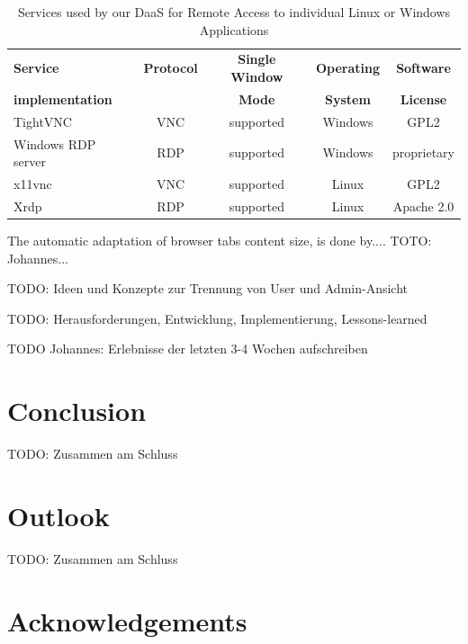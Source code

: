 \documentclass[runningheads]{llncs}
\begin{document}
\begin{table}
	\centering
	\caption{Services used by our DaaS for Remote Access to individual Linux or Windows Applications}
	\begin{tabular}{|l|c|c|c|c|}
		\hline
		\textbf{Service}    &  \textbf{Protocol}  & \textbf{Single Window}       & \textbf{Operating} & \textbf{Software}  \\
		\textbf{implementation}  &                & \textbf{Mode}                & \textbf{System}    & \textbf{License}   \\
		\hline
		TightVNC            &  VNC                & supported                    & Windows            & GPL2               \\
		\hline
		Windows RDP server  &  RDP                & supported                    & Windows            & proprietary        \\
		\hline
		x11vnc              &  VNC                & supported                    & Linux              & GPL2               \\
		\hline
		Xrdp                &  RDP                & supported                    & Linux              & Apache 2.0         \\
		\hline
	\end{tabular}
	\label{tab:DaaS_Services_Overview}
\end{table}

The automatic adaptation of browser tabs content size, is done by.... TOTO: Johannes...

TODO: Ideen und Konzepte zur Trennung von User und Admin-Ansicht

TODO: Herausforderungen, Entwicklung, Implementierung, Lessons-learned

TODO Johannes: Erlebnisse der letzten 3-4 Wochen aufschreiben



\section{Conclusion}
\label{sec:Conclusions}

TODO: Zusammen am Schluss

\section{Outlook}
\label{sec:NextSteps}

TODO: Zusammen am Schluss

\section*{Acknowledgements}
\end{document}
